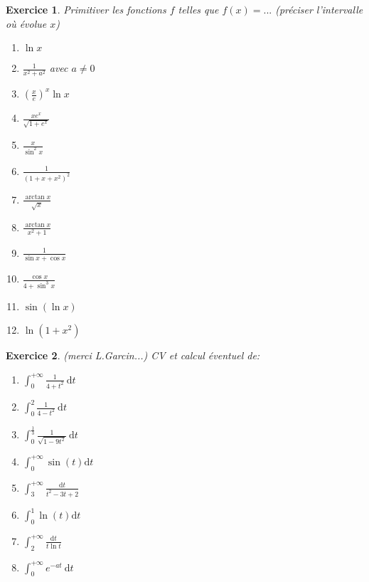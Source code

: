 \documentclass[12pt,a4paper]{article}
\theoremstyle{break}
\newtheorem{Exo}{Exercice}
\begin{document}
 \begin{Exo}
	Primitiver les fonctions $f$ telles que $f(x)=...$ (préciser l'intervalle où évolue $x$)
	\begin{multicols}{4}
		\begin{enumerate}
			\item 
			$\ln x$
			\item 
			$\frac{1}{x^2+a^2}$ avec $a\neq 0$
			\item
			$\left( \frac{x}{e}\right) ^{x}\ln x$
			\item
			$\frac{xe^{x}}{\sqrt{1+e^{x}}}$
			\item 
			$\frac{x}{\sin ^{2}x}$
			\item 
			$\frac{1}{\left( 1+x+x^{2}\right) ^{2}}$
			\item 
			$\frac{\arctan x}{\sqrt{x}}$
			\item 
			$\frac{\arctan x}{x^{2}+1}$
			\item 
			$\frac{1}{\sin x+\cos x}$
			\item 
			$\frac{\cos x}{4+\sin ^{3}x}$
			\item 
			$\sin \left( \ln x\right) $
			\item 
			$\ln \left(
			1+x^{2}\right) $
		\end{enumerate}
	\end{multicols}
\end{Exo}


\begin{Exo}(merci L.Garcin...)
	CV et calcul éventuel de:
	\begin{multicols}{4}
		\begin{enumerate}
			\item
			$\int_{0}^{+\infty} \frac{1}{4+t^{2}} \mathrm{~d} t$	
			\item
			$\int_{0}^{2} \frac{1}{4-t^{2}} \mathrm{~d} t$
			\item
			$\int_{0}^{\frac{1}{3}} \frac{1}{\sqrt{1-9 t^{2}}} \mathrm{~d} t$
			\item
			$\int_{0}^{+\infty} \sin (t) \mathrm{d} t$
			\item
			$\int_{3}^{+\infty} \frac{\mathrm{d} t}{t^{2}-3 t+2}$
			\item
			$\int_{0}^{1} \ln (t) \mathrm{d} t$
			\item
			$\int_{2}^{+\infty} \frac{\mathrm{d} t}{t \ln t}$
			\item
			$\int_{0}^{+\infty} e^{-a t} \mathrm{~d} t$
		\end{enumerate}
	\end{multicols}
\end{Exo}
\end{document}
